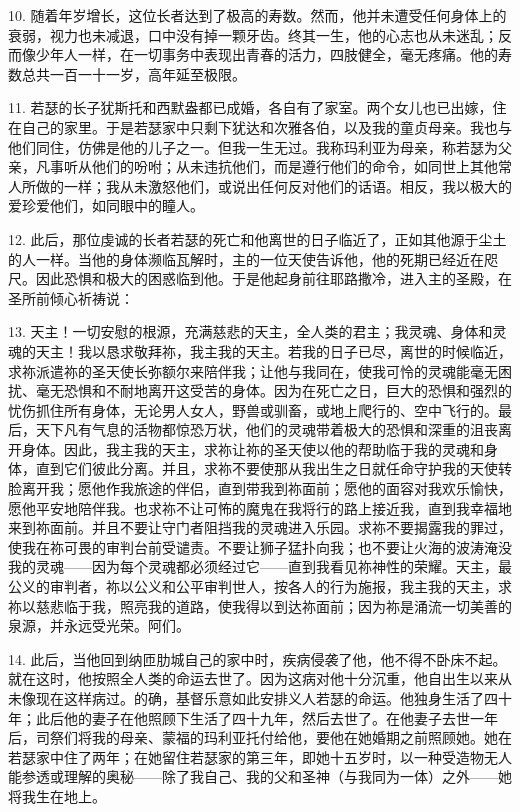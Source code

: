 10. 随着年岁增长，这位长者达到了极高的寿数。然而，他并未遭受任何身体上的衰弱，视力也未减退，口中没有掉一颗牙齿。终其一生，他的心志也从未迷乱；反而像少年人一样，在一切事务中表现出青春的活力，四肢健全，毫无疼痛。他的寿数总共一百一十一岁，高年延至极限。\par

11. 若瑟的长子犹斯托和西默盎都已成婚，各自有了家室。两个女儿也已出嫁，住在自己的家里。于是若瑟家中只剩下犹达和次雅各伯，以及我的童贞母亲。我也与他们同住，仿佛是他的儿子之一。但我一生无过。我称玛利亚为母亲，称若瑟为父亲，凡事听从他们的吩咐；从未违抗他们，而是遵行他们的命令，如同世上其他常人所做的一样；我从未激怒他们，或说出任何反对他们的话语。相反，我以极大的爱珍爱他们，如同眼中的瞳人。\par

12. 此后，那位虔诚的长者若瑟的死亡和他离世的日子临近了，正如其他源于尘土的人一样。当他的身体濒临瓦解时，主的一位天使告诉他，他的死期已经近在咫尺。因此恐惧和极大的困惑临到他。于是他起身前往耶路撒冷，进入主的圣殿，在圣所前倾心祈祷说：\par

13. 天主！一切安慰的根源，充满慈悲的天主，全人类的君主；我灵魂、身体和灵魂的天主！我以恳求敬拜祢，我主我的天主。若我的日子已尽，离世的时候临近，求祢派遣祢的圣天使长弥额尔来陪伴我；让他与我同在，使我可怜的灵魂能毫无困扰、毫无恐惧和不耐地离开这受苦的身体。因为在死亡之日，巨大的恐惧和强烈的忧伤抓住所有身体，无论男人女人，野兽或驯畜，或地上爬行的、空中飞行的。最后，天下凡有气息的活物都惊恐万状，他们的灵魂带着极大的恐惧和深重的沮丧离开身体。因此，我主我的天主，求祢让祢的圣天使以他的帮助临于我的灵魂和身体，直到它们彼此分离。并且，求祢不要使那从我出生之日就任命守护我的天使转脸离开我；愿他作我旅途的伴侣，直到带我到祢面前；愿他的面容对我欢乐愉快，愿他平安地陪伴我。也求祢不让可怖的魔鬼在我将行的路上接近我，直到我幸福地来到祢面前。并且不要让守门者阻挡我的灵魂进入乐园。求祢不要揭露我的罪过，使我在祢可畏的审判台前受谴责。不要让狮子猛扑向我；也不要让火海的波涛淹没我的灵魂——因为每个灵魂都必须经过它——直到我看见祢神性的荣耀。天主，最公义的审判者，祢以公义和公平审判世人，按各人的行为施报，我主我的天主，求祢以慈悲临于我，照亮我的道路，使我得以到达祢面前；因为祢是涌流一切美善的泉源，并永远受光荣。阿们。\par

14. 此后，当他回到纳匝肋城自己的家中时，疾病侵袭了他，他不得不卧床不起。就在这时，他按照全人类的命运去世了。因为这病对他十分沉重，他自出生以来从未像现在这样病过。的确，基督乐意如此安排义人若瑟的命运。他独身生活了四十年；此后他的妻子在他照顾下生活了四十九年，然后去世了。在他妻子去世一年后，司祭们将我的母亲、蒙福的玛利亚托付给他，要他在她婚期之前照顾她。她在若瑟家中住了两年；在她留住若瑟家的第三年，即她十五岁时，以一种受造物无人能参透或理解的奥秘——除了我自己、我的父和圣神（与我同为一体）之外——她将我生在地上。\par


